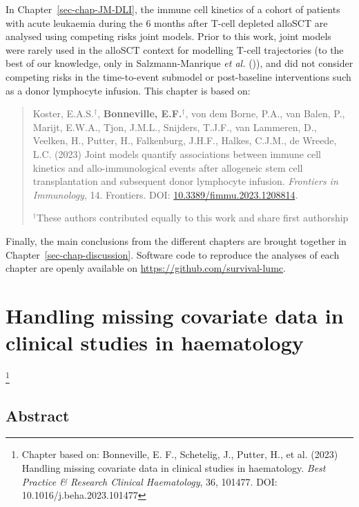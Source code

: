 \documentclass[
  letterpaper,
  paper=240mm:170mm,
  twoside=true,
  open=right,
  fontsize=10pt,
  pagesize=false,
  BCOR=15mm,
  DIV=14,
  headinclude=true,
  footinclude=false,
  headsepline=on]{scrbook}
\newcommand\blfootnote[1]{%
  \begingroup
  \renewcommand\thefootnote{}\footnote{#1}%
  \addtocounter{footnote}{-1}%
  \endgroup
}
\begin{document}
In Chapter~\ref{sec-chap-JM-DLI}, the immune cell kinetics of a cohort
of patients with acute leukaemia during the 6 months after T-cell
depleted alloSCT are analysed using competing risks joint models. Prior
to this work, joint models were rarely used in the alloSCT context for
modelling T-cell trajectories (to the best of our knowledge, only in
Salzmann-Manrique \emph{et al.}
()), and
did not consider competing risks in the time-to-event submodel or
post-baseline interventions such as a donor lymphocyte infusion. This
chapter is based on:

\begin{quote}
Koster, E.A.S.\(^\dagger\), \textbf{Bonneville, E.F.}\(^\dagger\), von
dem Borne, P.A., van Balen, P., Marijt, E.W.A., Tjon, J.M.L., Snijders,
T.J.F., van Lammeren, D., Veelken, H., Putter, H., Falkenburg, J.H.F.,
Halkes, C.J.M., de Wreede, L.C. (2023) Joint models quantify
associations between immune cell kinetics and allo-immunological events
after allogeneic stem cell transplantation and subsequent donor
lymphocyte infusion. \emph{Frontiers in Immunology}, 14. Frontiers. DOI:
\href{https://doi.org/10.3389/fimmu.2023.1208814}{10.3389/fimmu.2023.1208814}.

\(^\dagger\)These authors contributed equally to this work and share
first authorship
\end{quote}

Finally, the main conclusions from the different chapters are brought
together in Chapter~\ref{sec-chap-discussion}. Software code to
reproduce the analyses of each chapter are openly available on
\url{https://github.com/survival-lumc}.


\chapter{Handling missing covariate data in clinical studies in
haematology}\label{sec-chap-haema-review}

\blfootnote{Chapter based on: Bonneville, E. F., Schetelig, J., Putter, H., et al. (2023) Handling missing covariate data in clinical studies in haematology. \textit{Best Practice \& Research Clinical Haematology}, 36, 101477. DOI: 10.1016/j.beha.2023.101477}

\clearpage

\section*{Abstract}\label{abstract}
\end{document}
